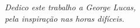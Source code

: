 
\vspace*{\fill}
\centering
\noindent
\textit{Dedico este trabalho a George Lucas,\\
	pela inspiração nas horas difíceis.}
\vspace*{\fill}
